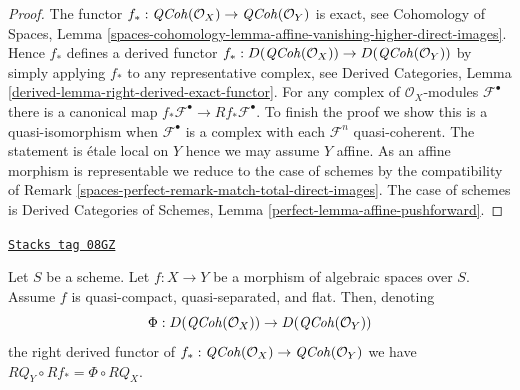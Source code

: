 \begin{proof}
The functor
$f_* : \mathit{QCoh}(\mathcal{O}_X) \to \mathit{QCoh}(\mathcal{O}_Y)$
is exact, see
Cohomology of Spaces, Lemma
\ref{spaces-cohomology-lemma-affine-vanishing-higher-direct-images}.
Hence $f_*$ defines a derived functor
$f_* : D(\mathit{QCoh}(\mathcal{O}_X)) \to D(\mathit{QCoh}(\mathcal{O}_Y))$
by simply applying $f_*$ to any representative complex, see
Derived Categories, Lemma \ref{derived-lemma-right-derived-exact-functor}.
For any complex of $\mathcal{O}_X$-modules
$\mathcal{F}^\bullet$ there is a canonical map
$f_*\mathcal{F}^\bullet \to Rf_*\mathcal{F}^\bullet$.
To finish the proof we show this is a quasi-isomorphism when
$\mathcal{F}^\bullet$ is a complex with each $\mathcal{F}^n$
quasi-coherent. The statement is \'etale local on $Y$ hence we
may assume $Y$ affine. As an affine morphism is representable
we reduce to the case of schemes by the compatibility of
Remark \ref{spaces-perfect-remark-match-total-direct-images}. The case of schemes is
Derived Categories of Schemes, Lemma \ref{perfect-lemma-affine-pushforward}.
\end{proof}

\begin{lemma}
\label{spaces-perfect-lemma-flat-pushforward-coherator}
\href{https://stacks.math.columbia.edu/tag/08GZ}{\texttt{Stacks tag 08GZ}}

Let $S$ be a scheme. Let $f : X \to Y$ be a morphism of algebraic
spaces over $S$. Assume $f$ is quasi-compact, quasi-separated, and flat.
Then, denoting
$$
\Phi : D(\mathit{QCoh}(\mathcal{O}_X)) \to D(\mathit{QCoh}(\mathcal{O}_Y))
$$
the right derived functor of
$f_* : \mathit{QCoh}(\mathcal{O}_X) \to \mathit{QCoh}(\mathcal{O}_Y)$
we have $RQ_Y \circ Rf_* = \Phi \circ RQ_X$.
\end{lemma}

